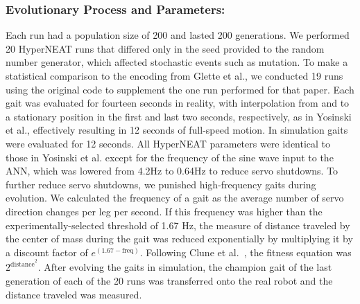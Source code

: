 
\subsubsection{Evolutionary Process and Parameters:}

Each run had a population size of 200 and lasted 200 generations. We performed 20 HyperNEAT runs that differed only in the seed provided to the random number generator, which affected stochastic events such as mutation. To make a statistical comparison to the encoding from Glette et al., we conducted 19 runs using the original code to supplement the one run performed for that paper. 
Each gait was evaluated for fourteen seconds in reality, with interpolation from and to a stationary position in the first and last two seconds, respectively, as in Yosinski et al., effectively resulting in 12 seconds of full-speed
motion. In simulation gaits were evaluated for 12 seconds. 
All HyperNEAT parameters were identical to those in Yosinski et al. except for the frequency of the sine wave input to the ANN, which was lowered from 4.2Hz to 0.64Hz to reduce servo shutdowns. 
To further reduce servo shutdowns, we punished high-frequency gaits during evolution. We calculated the frequency of a gait as the average number of servo direction changes per leg per second. If this frequency was higher than the experimentally-selected threshold of 1.67 Hz, the measure of distance traveled by the center of mass during the gait was reduced exponentially by multiplying it by a discount factor of $e^{(1.67-\mathrm{freq})}$. Following Clune et al.~\cite{clune2009evolving}, the fitness equation was $2^{\mathrm{distance}^{2}}$. After evolving the gaits in simulation, the champion gait of the last generation of each of the 20 runs was transferred onto the real robot and the distance traveled was measured. 

